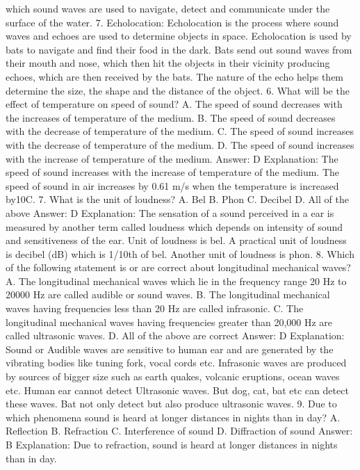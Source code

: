 which sound waves are used to navigate, detect and communicate
under the surface of the water.
7. Echolocation: Echolocation is the process where sound waves and
echoes are used to determine objects in space. Echolocation is used
by bats to navigate and find their food in the dark. Bats send out
sound waves from their mouth and nose, which then hit the objects
in their vicinity producing echoes, which are then received by the
bats. The nature of the echo helps them determine the size, the
shape and the distance of the object.
6. What will be the effect of temperature on speed of sound?
A. The speed of sound decreases with the increases of temperature
of the medium.
B. The speed of sound decreases with the decrease of temperature
of the medium.
C. The speed of sound increases with the decrease of temperature
of the medium.
D. The speed of sound increases with the increase of temperature
of the medium.
Answer: D
Explanation: The speed of sound increases with the increase of
temperature of the medium. The speed of sound in air increases by
0.61 m/s when the temperature is increased by10C.
7. What is the unit of loudness?
A. Bel
B. Phon
C. Decibel
D. All of the above
Answer: D
Explanation: The sensation of a sound perceived in a ear is
measured by another term called loudness which depends on
intensity of sound and sensitiveness of the ear. Unit of loudness is
bel. A practical unit of loudness is decibel (dB) which is 1/10th of
bel. Another unit of loudness is phon.
8. Which of the following statement is or are correct about
longitudinal mechanical waves?
A. The longitudinal mechanical waves which lie in the frequency
range 20 Hz to 20000 Hz are called audible or sound waves.
B. The longitudinal mechanical waves having frequencies less than 20
Hz are called infrasonic.
C. The longitudinal mechanical waves having frequencies greater than
20,000 Hz are called ultrasonic waves.
D. All of the above are correct
Answer: D
Explanation: Sound or Audible waves are sensitive to human ear and
are generated by the vibrating bodies like tuning fork, vocal cords
etc. Infrasonic waves are produced by sources of bigger size such as
earth quakes, volcanic eruptions, ocean waves etc. Human ear cannot
detect Ultrasonic waves. But dog, cat, bat etc can detect these
waves. Bat not only detect but also produce ultrasonic waves.
9. Due to which phenomena sound is heard at longer distances in
nights than in day?
A. Reflection
B. Refraction
C. Interference of sound
D. Diffraction of sound
Answer: B
Explanation: Due to refraction, sound is heard at longer distances
in nights than in day.
